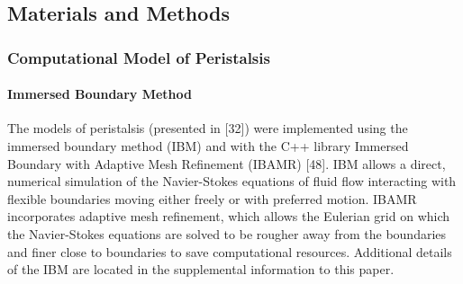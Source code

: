 \documentclass[
]{article}
\begin{document}
\hypertarget{materials-and-methods}{%
\subsection{Materials and Methods}\label{materials-and-methods}}

\hypertarget{computational-model-of-peristalsis}{%
\subsubsection{Computational Model of
Peristalsis}\label{computational-model-of-peristalsis}}

\hypertarget{immersed-boundary-method}{%
\paragraph{Immersed Boundary Method}\label{immersed-boundary-method}}

The models of peristalsis (presented in {[}32{]}) were implemented using
the immersed boundary method (IBM) and with the C++ library Immersed
Boundary with Adaptive Mesh Refinement (IBAMR) {[}48{]}. IBM allows a
direct, numerical simulation of the Navier-Stokes equations of fluid
flow interacting with flexible boundaries moving either freely or with
preferred motion. IBAMR incorporates adaptive mesh refinement, which
allows the Eulerian grid on which the Navier-Stokes equations are solved
to be rougher away from the boundaries and finer close to boundaries to
save computational resources. Additional details of the IBM are located
in the supplemental information to this paper.
\end{document}
